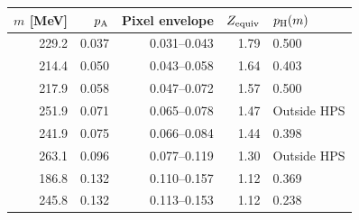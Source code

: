 \begin{tabular}{rrrrl}
\toprule
$m$ [MeV] & $p_{\rm A}$ & Pixel envelope & $Z_{\rm equiv}$ & $p_{\rm H}(m)$ \\
\midrule
229.2 & 0.037 & 0.031--0.043 & 1.79 & 0.500 \\
214.4 & 0.050 & 0.043--0.058 & 1.64 & 0.403 \\
217.9 & 0.058 & 0.047--0.072 & 1.57 & 0.500 \\
251.9 & 0.071 & 0.065--0.078 & 1.47 & Outside HPS \\
241.9 & 0.075 & 0.066--0.084 & 1.44 & 0.398 \\
263.1 & 0.096 & 0.077--0.119 & 1.30 & Outside HPS \\
186.8 & 0.132 & 0.110--0.157 & 1.12 & 0.369 \\
245.8 & 0.132 & 0.113--0.153 & 1.12 & 0.238 \\
\bottomrule
\end{tabular}
